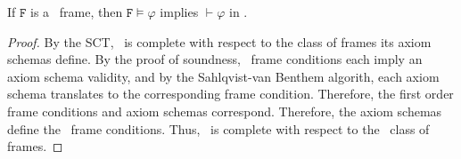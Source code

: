 \begin{theorem}\label{completeness}
	If $\mathtt{F}$ is a \DASL\ frame, then $\mathtt{F}\models \varphi$ implies $\vdash \varphi$ in \DASL.
\end{theorem}
\begin{proof}
	By the SCT, \DASL\ is complete with respect to the class of frames its axiom schemas define. By the proof of soundness, \DASL\ frame conditions each imply an axiom schema validity, and by the Sahlqvist-van Benthem algorith, each axiom schema translates to the corresponding frame condition. Therefore, the first order frame conditions and axiom schemas correspond. Therefore, the axiom schemas define the \DASL\ frame conditions. Thus, \DASL\ is complete with respect to the \DASL\ class of frames.
\end{proof}
%


%

